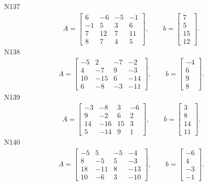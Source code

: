 \documentclass[11pt]{report}
\begin{document}
N137
\begin{align*}
 A = \left[\begin{matrix}6 & -6 & -5 & -1\\-1 & 5 & 3 & 6\\7 & 12 & 7 & 11\\8 & 7 & 4 & 5\end{matrix}\right],
\qquad b = \left[\begin{matrix}7\\5\\15\\12\end{matrix}\right]. 
 \end{align*}
N138
\begin{align*}
 A = \left[\begin{matrix}-5 & 2 & -7 & -2\\4 & -7 & 9 & -3\\10 & -15 & 6 & -14\\6 & -8 & -3 & -11\end{matrix}\right],
\qquad b = \left[\begin{matrix}-4\\6\\9\\8\end{matrix}\right]. 
 \end{align*}
N139
\begin{align*}
 A = \left[\begin{matrix}-3 & -8 & 3 & -6\\9 & -2 & 6 & 2\\14 & -16 & 15 & 3\\5 & -14 & 9 & 1\end{matrix}\right],
\qquad b = \left[\begin{matrix}3\\8\\14\\11\end{matrix}\right]. 
 \end{align*}
N140
\begin{align*}
 A = \left[\begin{matrix}-5 & 5 & -5 & -4\\8 & -5 & 5 & -3\\18 & -11 & 8 & -13\\10 & -6 & 3 & -10\end{matrix}\right],
\qquad b = \left[\begin{matrix}-6\\4\\-3\\-1\end{matrix}\right]. 
 \end{align*}
\end{document}
